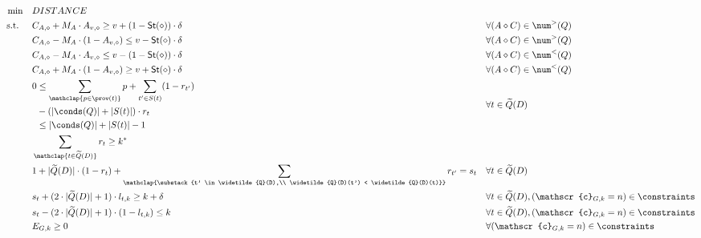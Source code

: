 \begin{figure}
    \centering
    \footnotesize
    \begin{align*}
        \min \quad & DISTANCE && \notag \\
        \textrm{s.t. } \quad & C_{A, \diamond} + M_A \cdot A_{v, \diamond} \geq v + (1 - {\sf St}(\diamond)) \cdot \delta && \forall (A \diamond C) \in \num^{>}(Q) \\
        & C_{A, \diamond} - M_A \cdot (1 - A_{v, \diamond}) \leq v - {\sf St}(\diamond) \cdot \delta && \forall (A \diamond C) \in \num^{>}(Q) \\
        & C_{A, \diamond} - M_A \cdot A_{v, \diamond} \leq v - (1 - {\sf St}(\diamond)) \cdot \delta && \forall (A \diamond C) \in \num^{<}(Q) \\
        & C_{A, \diamond} + M_A \cdot (1 - A_{v, \diamond}) \geq v + {\sf St}(\diamond) \cdot \delta && \forall (A \diamond C) \in \num^{<}(Q) \\ 
        & \begin{aligned}
            0 &\leq \sum_{\mathclap{p \in \prov(t)}} p + \sum_{t' \in S(t)} (1 - r_{t'})\\
              &- (|\conds(Q)| + |S(t)|) \cdot r_t \\
              &\leq |\conds(Q)| + |S(t)| - 1
        \end{aligned}&& \forall t \in \widetilde{Q}(D)  \\
        & \sum_{\mathclap{t \in \widetilde{Q}(D)}} r_{t} \geq k^* \\
        & 1 + |\widetilde{Q}(D)| \cdot (1 - r_t) + \sum_{\mathclap{\substack{t' \in \widetilde{Q}(D),\\ \widetilde{Q}(D)(t') < \widetilde{Q}(D)(t)}}} r_{t'} = s_{t} && \forall t \in \widetilde{Q}(D) \\
        & s_t + (2 \cdot |\widetilde{Q}(D)| + 1) \cdot l_{t, k} \geq k + \delta && \forall t \in \widetilde{Q}(D), (\mathscr{c}_{G, k} = n) \in \constraints \\
        & s_t - (2 \cdot |\widetilde{Q}(D)| + 1) \cdot (1 - l_{t, k}) \leq k && \forall t \in \widetilde{Q}(D), (\mathscr{c}_{G, k} = n) \in \constraints \\
        & E_{G, k} \geq 0 && \forall (\mathscr{c}_{G, k} = n) \in \constraints \\

\end{align*}
\end{figure}
